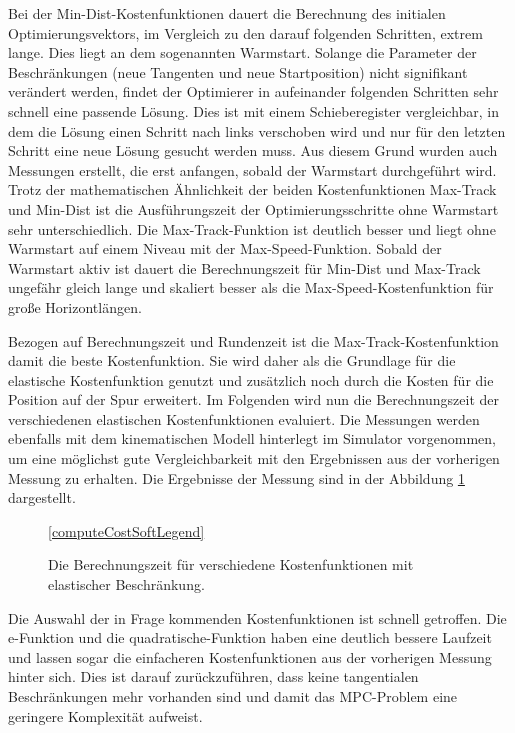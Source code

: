 \documentclass{like}
\begin{document}
Bei der Min-Dist-Kostenfunktionen dauert die Berechnung des initialen Op\-ti\-mie\-rungs\-vek\-tors, im Vergleich zu den darauf folgenden Schritten, extrem lange. Dies liegt an dem sogenannten Warmstart. Solange die Parameter der Beschränkungen (neue Tangenten und neue Start\-po\-si\-tion) nicht signifikant verändert werden, findet der Optimierer in aufeinander folgenden Schritten sehr schnell eine passende Lösung. Dies ist mit einem  Schieberegister ver\-gleich\-bar, in dem die Lösung einen Schritt nach links verschoben wird und nur für den letzten Schritt eine neue Lösung gesucht werden muss. Aus diesem Grund wurden auch Messungen erstellt, die erst anfangen, sobald der Warmstart durchgeführt wird. 
Trotz der ma\-the\-ma\-tisch\-en Ähnlichkeit der beiden Kostenfunktionen Max-Track und Min-Dist ist die Ausführungszeit der Optimierungsschritte ohne Warmstart sehr unterschiedlich. Die Max-Track-Funktion ist deutlich besser und liegt ohne Warmstart auf einem Niveau mit der Max-Speed-Funktion.
Sobald der Warmstart aktiv ist dauert die Berechnungszeit für Min-Dist und Max-Track ungefähr gleich lange und skaliert besser als die Max-Speed-Kostenfunktion für große Horizontlängen.


Bezogen auf Berechnungszeit und Rundenzeit ist die Max-Track-Kostenfunktion damit die beste Kostenfunktion. Sie wird daher als die Grundlage für die elastische Kostenfunktion genutzt und zusätzlich noch durch die Kosten für die Position auf der Spur erweitert. Im Folgenden wird nun die Berechnungszeit der verschiedenen elastischen Kostenfunktionen evaluiert. Die Messungen werden ebenfalls mit dem kinematischen Modell hinterlegt im Simulator vorgenommen, um eine möglichst gute Vergleichbarkeit mit den Ergebnissen aus der vorherigen Messung zu erhalten. Die Ergebnisse der Messung sind in der Abbildung \ref{fig:computeCostSoftConst} dargestellt.

\begin{figure}[ht!]
	\centering
	 
	\ref{computeCostSoftLegend}
	\caption{Die Berechnungszeit für verschiedene Kostenfunktionen mit elastischer Be\-schrän\-kung.}
	\label{fig:computeCostSoftConst}
\end{figure}

Die Auswahl der in Frage kommenden Kostenfunktionen ist schnell getroffen. Die e-Funktion und die quadratische-Funktion haben eine deutlich bessere Laufzeit und lassen sogar die einfacheren Kostenfunktionen aus der vorherigen Messung hinter sich. Dies ist darauf zurückzuführen, dass keine tangentialen Beschränkungen mehr vorhanden sind und damit das \ac{MPC}-Problem eine geringere Komplexität aufweist.
\end{document}
